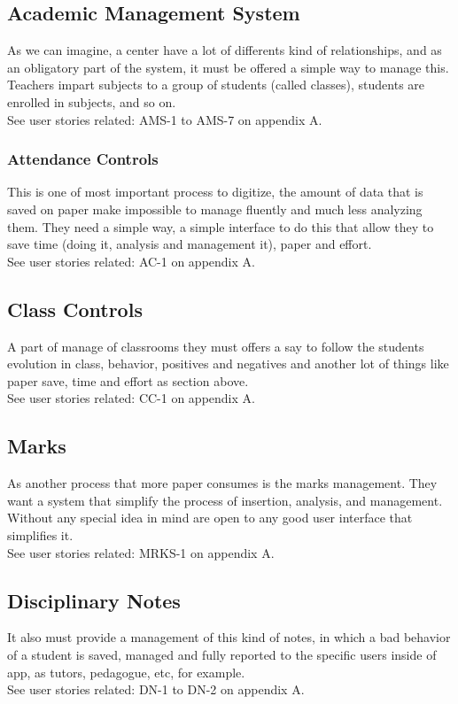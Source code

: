 \subsection{Academic Management System}

As we can imagine, a center have a lot of differents kind of relationships,
and as an obligatory part of the system, it must be offered a simple way to manage this.
Teachers impart subjects to a group of students (called classes), students are
enrolled in subjects, and so on.
\\
See user stories related: AMS-1 to AMS-7 on appendix A.

\subsubsection{Attendance Controls}

This is one of most important process to digitize, the amount of data that is saved on
paper make impossible to manage fluently and much less  analyzing them.
They need a simple way, a simple interface to do this that allow they to save time
(doing it, analysis and management it), paper and effort.
\\
See user stories related: AC-1 on appendix A.

\subsection{Class Controls}

A part of manage of classrooms they must offers a say to follow the students
evolution in class, behavior, positives and negatives and another lot of things
like paper save, time and effort as section above.
\\
See user stories related: CC-1 on appendix A.

\subsection{Marks}

As another process that more paper consumes is the marks management.
They want a system that simplify the process of insertion, analysis, and management.
Without any special idea in mind are open to any good user interface that simplifies it.
\\
See user stories related: MRKS-1 on appendix A.

\subsection{Disciplinary Notes}
It also must provide a management of this kind of notes, in which a bad behavior
of a student is saved, managed and fully reported to the specific users inside of
app, as tutors, pedagogue, etc, for example.
\\
See user stories related: DN-1 to DN-2 on appendix A.

